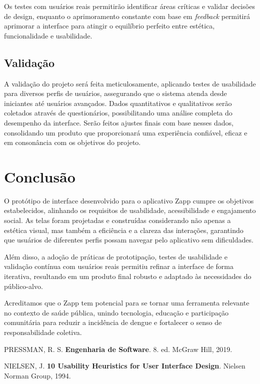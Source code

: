 \documentclass[a4paper, 12pt]{article}
\begin{document}
Os testes com usuários reais permitirão identificar áreas críticas e validar decisões de design, enquanto o aprimoramento constante com base em \textit{feedback} permitirá aprimorar a interface para atingir o equilíbrio perfeito entre estética, funcionalidade e usabilidade.



\subsection{Validação}

A validação do projeto será feita meticulosamente, aplicando testes de usabilidade para diversos perfis de usuários, assegurando que o sistema atenda desde iniciantes até usuários avançados. Dados quantitativos e qualitativos serão coletados através de questionários, possibilitando uma análise completa do desempenho da interface. Serão feitos ajustes finais com base nesses dados, consolidando um produto que proporcionará uma experiência confiável, eficaz e em consonância com os objetivos do projeto.

\newpage
\section{Conclusão}

O protótipo de interface desenvolvido para o aplicativo Zapp cumpre os objetivos estabelecidos, alinhando os requisitos de usabilidade, acessibilidade e engajamento social. As telas foram projetadas e construídas considerando não apenas a estética visual, mas também a eficiência e a clareza das interações, garantindo que usuários de diferentes perfis possam navegar pelo aplicativo sem dificuldades.  

Além disso, a adoção de práticas de prototipação, testes de usabilidade e validação contínua com usuários reais permitiu refinar a interface de forma iterativa, resultando em um produto final robusto e adaptado às necessidades do público-alvo.  

Acreditamos que o Zapp tem potencial para se tornar uma ferramenta relevante no contexto de saúde pública, unindo tecnologia, educação e participação comunitária para reduzir a incidência de dengue e fortalecer o senso de responsabilidade coletiva.

\newpage
\begin{thebibliography}{09}
 PRESSMAN, R. S. 
\textbf{Engenharia de Software}. 
8. ed. McGraw Hill, 2019.


 NIELSEN, J. 
\textbf{10 Usability Heuristics for User Interface Design}. 
Nielsen Norman Group, 1994.
\end{thebibliography}
\end{document}
